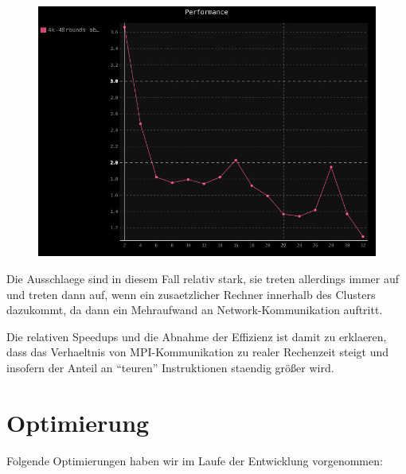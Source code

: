 \begin{figure}[htbp]
\centering
\includegraphics{pics/perf-abs.jpg}
\end{figure}

Die Ausschlaege sind in diesem Fall relativ stark, sie treten allerdings
immer auf und treten dann auf, wenn ein zusaetzlicher Rechner innerhalb
des Clusters dazukommt, da dann ein Mehraufwand an Network-Kommunikation
auftritt.

Die relativen Speedups und die Abnahme der Effizienz ist damit zu
erklaeren, dass das Verhaeltnis von MPI-Kommunikation zu realer
Rechenzeit steigt und insofern der Anteil an ``teuren'' Instruktionen
staendig größer wird.

\section{Optimierung}\label{optimierung}

Folgende Optimierungen haben wir im Laufe der Entwicklung vorgenommen:

